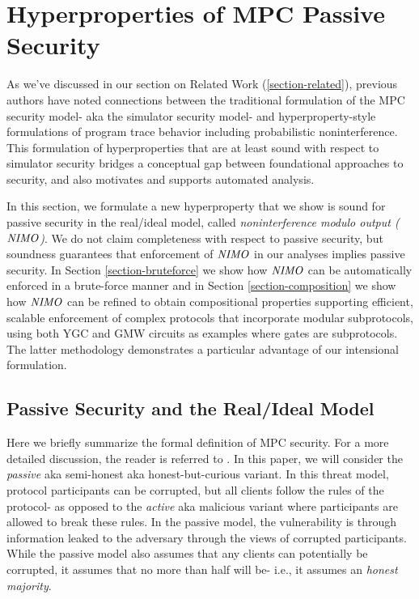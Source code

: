 \section{Hyperproperties of MPC Passive Security}
\label{section-hyperprop}

As we've discussed in our section on Related Work
(\ref{section-related}), previous authors have noted connections
between the traditional formulation of the MPC security model- aka the
simulator security model- and hyperproperty-style formulations of
program trace behavior \cite{8429300,wysstar} including probabilistic
noninterference. This formulation of hyperproperties that are at least
sound with respect to simulator security bridges a conceptual gap
between foundational approaches to security, and also motivates and
supports automated analysis. 

In this section, we formulate a new hyperproperty that we show is
sound for passive security in the real/ideal model, called
\emph{noninterference modulo output ($\mathit{NIMO}$)}. We do not claim
completeness with respect to passive security, but soundness
guarantees that enforcement of $\mathit{NIMO}$ in our analyses implies passive
security. In Section \ref{section-bruteforce} we show how $\mathit{NIMO}$ can
be automatically enforced in a brute-force manner and in Section
\ref{section-composition} we show how $\mathit{NIMO}$ can be refined to obtain
compositional properties supporting efficient, scalable enforcement of
complex protocols that incorporate modular subprotocols, using
both YGC and GMW circuits as examples where gates are
subprotocols. The latter methodology demonstrates a particular
advantage of our intensional formulation.

\subsection{Passive Security and the Real/Ideal Model}
\label{section-hyperprop-passive}
Here we briefly summarize the formal definition of MPC security. For a
more detailed discussion, the reader is referred to \cite{evans2018pragmatic}.
In this paper, we will consider the \emph{passive} aka
semi-honest aka honest-but-curious variant. In this threat
model, protocol participants can be corrupted, but all clients
follow the rules of the protocol- as opposed to the
\emph{active} aka malicious variant where participants
are allowed to break these rules. In the passive model, the
vulnerability is through information leaked to the adversary
through the views of corrupted participants. While the passive
model also assumes that any clients can potentially be
corrupted, it assumes that no more than half will be-
i.e., it assumes an \emph{honest majority}. 

